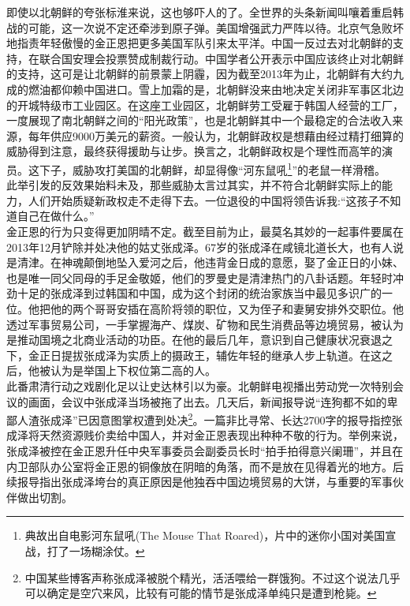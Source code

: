 即使以北朝鲜的夸张标淮来说，这也够吓人的了。全世界的头条新闻叫嚷着重启韩战的可能，这一次说不定还牵涉到原子弹。美国增强武力严阵以待。北京气急败坏地指责年轻傲慢的金正恩把更多美国军队引来太平洋。中国一反过去对北朝鲜的支持，在联合国安理会投票赞成制裁行动。中国学者公开表示中国应该终止对北朝鲜的支持，这可是让北朝鲜的前景蒙上阴霾，因为截至2013年为止，北朝鲜有大约九成的燃油都仰赖中国进口。雪上加霜的是，北朝鲜没来由地决定关闭非军事区北边的开城特级市工业园区。在这座工业园区，北朝鲜劳工受雇于韩国人经营的工厂，一度展现了南北朝鲜之间的“阳光政策”，也是北朝鲜其中一个最稳定的合法收入来源，每年供应9000万美元的薪资。一般认为，北朝鲜政权是想藉由经过精打细算的威胁得到注意，最终获得援助与让步。换言之，北朝鲜政权是个理性而高竿的演员。这下子，威胁攻打美国的北朝鲜，却显得像“河东鼠吼\footnote{典故出自电影河东鼠吼(The Mouse That Roared)，片中的迷你小国对美国宣战，打了一场糊涂仗。}”的老鼠一样滑稽。\\

此举引发的反效果始料未及，那些威胁太言过其实，并不符合北朝鲜实际上的能力，人们开始质疑新政权走不走得下去。一位退役的中国将领告诉我:“这孩子不知道自己在做什么。”\\

金正恩的行为只变得更加阴晴不定。截至目前为止，最莫名其妙的一起事件要属在2013年12月铲除并处决他的姑丈张成泽。67岁的张成泽在咸镜北道长大，也有人说是清津。在神魂颠倒地坠入爱河之后，他违背金日成的意愿，娶了金正日的小妹、也是唯一同父同母的手足金敬姬，他们的罗曼史是清津热门的八卦话题。年轻时冲劲十足的张成泽到过韩国和中国，成为这个封闭的统治家族当中最见多识广的一位。他把他的两个哥哥安插在高阶将领的职位，又为侄子和妻舅安排外交职位。他透过军事贸易公司，一手掌握海产、煤炭、矿物和民生消费品等边境贸易，被认为是推动国境之北商业活动的功臣。在他的最后几年，意识到自己健康状况衰退之下，金正日提拔张成泽为实质上的摄政王，辅佐年轻的继承人步上轨道。在这之后，他被认为是举国上下权位第二高的人。\\

此番肃清行动之戏剧化足以让史达林引以为豪。北朝鲜电视播出劳动党一次特别会议的画面，会议中张成泽当场被拖了出去。几天后，新闻报导说“连狗都不如的卑鄙人渣张成泽”已因意图掌权遭到处决\footnote{中国某些博客声称张成泽被脱个精光，活活喂给一群饿狗。不过这个说法几乎可以确定是空穴来风，比较有可能的情节是张成泽单纯只是遭到枪毙。}。一篇非比寻常、长达2700字的报导指控张成泽将天然资源贱价卖给中国人，并对金正恩表现出种种不敬的行为。举例来说，张成泽被控在金正恩升任中央军事委员会副委员长时“拍手拍得意兴阑珊”，并且在内卫部队办公室将金正恩的铜像放在阴暗的角落，而不是放在见得着光的地方。后续报导指出张成泽垮台的真正原因是他独吞中国边境贸易的大饼，与重要的军事伙伴做出切割。\\

